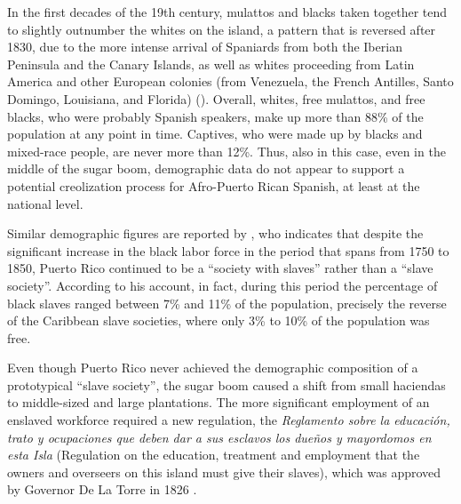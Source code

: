 \documentclass[output=paper,colorlinks,citecolor=brown]{langscibook}
\begin{document}
In the first decades of the 19th century, mulattos and blacks taken together tend to slightly outnumber the whites on the island, a pattern that is reversed after 1830, due to the more intense arrival of Spaniards from both the Iberian Peninsula and the Canary Islands, as well as whites proceeding from Latin America and other European colonies (from Venezuela, the French Antilles, Santo Domingo, Louisiana, and Florida) (\citealt[77--78]{AlvarezNazario1974}). Overall, whites, free mulattos, and free blacks, who were probably Spanish speakers, make up more than 88\% of the population at any point in time. Captives, who were made up by blacks and mixed-race people, are never more than 12\%. Thus, also in this case, even in the middle of the sugar boom, demographic data do not appear to support a potential creolization process for Afro-Puerto Rican Spanish, at least at the national level.

Similar demographic figures are reported by \citet[329]{Moya2003}, who indicates that despite the significant increase in the black labor force in the period that spans from 1750 to 1850, Puerto Rico continued to be a “society with slaves” rather than a “slave society”. According to his account, in fact, during this period the percentage of black slaves ranged between 7\% and 11\% of the population, precisely the reverse of the Caribbean slave societies, where only 3\% to 10\% of the population was free. 

Even though Puerto Rico never achieved the demographic composition of a prototypical “slave society”, the sugar boom caused a shift from small haciendas to middle-sized and large plantations. The more significant employment of an enslaved workforce required a new regulation, the \textit{Reglamento sobre la educación, trato y ocupaciones que deben dar a sus esclavos los dueños y mayordomos en esta Isla} (Regulation on the education, treatment and employment that the owners and overseers on this island must give their slaves), which was approved by Governor De La Torre in 1826 \citep{Zavala-Trías2003}.
\end{document}
